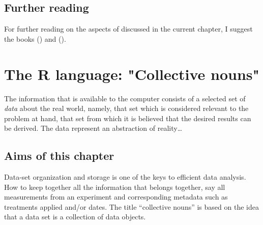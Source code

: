 \documentclass[krantz2]{krantz}\usepackage{knitr}
\begin{document}




\section{Further reading}
For further reading on the aspects of \Rlang discussed in the current chapter,
 I suggest the books  (\citeauthor{Peng2016}) and  (\citeauthor{Matloff2011}).











\chapter{The R language: "Collective nouns"}\label{chap:R:as:calc}

\begin{VF}
The information that is available to the computer consists of a selected set of \emph{data} about the real world, namely, that set which is considered relevant to the problem at hand, that set from which it is believed that the desired results can be derived. The data represent an abstraction of reality\ldots

\nocite{Wirth1976}
\end{VF}


\section{Aims of this chapter}

Data-set organization and storage is one of the keys to efficient data analysis. How to keep together all the information that belongs together, say all measurements from an experiment and corresponding metadata such as treatments applied and/or dates. The title ``collective nouns'' is based on the idea that a data set is a collection of data objects.
\end{document}

